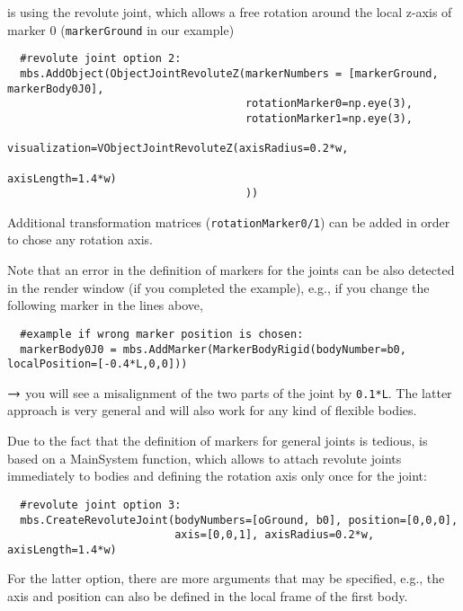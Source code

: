 \noindent {} is using the revolute joint, which allows a free rotation around the local z-axis of marker 0 (\texttt{markerGround} in our example)
\pythonstyle\begin{lstlisting}
  #revolute joint option 2:
  mbs.AddObject(ObjectJointRevoluteZ(markerNumbers = [markerGround, markerBody0J0], 
                                     rotationMarker0=np.eye(3),
                                     rotationMarker1=np.eye(3),
                                     visualization=VObjectJointRevoluteZ(axisRadius=0.2*w, 
                                                                         axisLength=1.4*w)
                                     )) 
\end{lstlisting}
Additional transformation matrices (\texttt{rotationMarker0/1}) can be added in order to chose any rotation axis.

\noindent Note that an error in the definition of markers for the joints can be also detected in the render window (if you completed the example), e.g., if you change the following marker in the lines above,
\pythonstyle\begin{lstlisting}
  #example if wrong marker position is chosen:
  markerBody0J0 = mbs.AddMarker(MarkerBodyRigid(bodyNumber=b0, localPosition=[-0.4*L,0,0]))
\end{lstlisting}
$\rightarrow$ you will see a misalignment of the two parts of the joint by \texttt{0.1*L}.
The latter approach is very general and will also work for any kind of flexible bodies.

\noindent Due to the fact that the definition of markers for general joints is tedious,  is based on a MainSystem function, which allows to attach revolute joints immediately to bodies and defining the rotation axis only once for the joint:
\pythonstyle\begin{lstlisting}
  #revolute joint option 3:
  mbs.CreateRevoluteJoint(bodyNumbers=[oGround, b0], position=[0,0,0], 
                          axis=[0,0,1], axisRadius=0.2*w, axisLength=1.4*w)
\end{lstlisting}
For the latter option, there are more arguments that may be specified, e.g., the axis and position can also be defined in the local frame of the first body.

